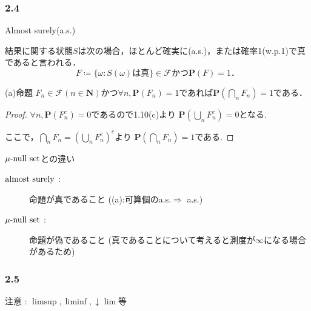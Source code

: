 \documentclass{jsarticle}
\begin{document}
\subsubsection*{2.4}
Almost surely(a.s.)

結果に関する状態$S$は次の場合，ほとんど確実に(a.s.)，または確率1(w.p.1)で真であると言われる．
\begin{equation}
    F \coloneqq \{\omega \colon S(\omega)は真\}\in\mathcal{F} かつ \mathbf{P}(F)=1 ．
\end{equation}

(a)命題 $F_n\in\mathcal{F}(n\in\mathbf{N})$かつ$\forall n,\mathbf{P}(F_n)=1$であれば$\mathbf{P}(\bigcap_n F_n)=1$である．

\begin{proof}
    $\forall n,\mathbf{P}(F_n^c)=0$であるので1.10(c)より
    $\mathbf{P}(\bigcup_n F_n^c)=0$となる.

    ここで，$\bigcap_n F_n=(\bigcup_n F_n^c)^c$より
    $\mathbf{P}(\bigcap_n F_n)=1$である.
\end{proof}

\begin{itembox}{$\rm \mu \text{-} null\ set$との違い}
    \begin{description}
        \item[$\rm almost\ surely$ :] 命題が真であること ((a):可算個のa.s.$\Rightarrow$ a.s.)
        \item[$\rm \mu \text{-} null\ set$ :] 命題が偽であること (真であることについて考えると測度が$\infty$になる場合があるため)
    \end{description}
\end{itembox}

\subsubsection*{2.5}
注意 :  $\limsup, \liminf, \downarrow\lim$等
\end{document}
